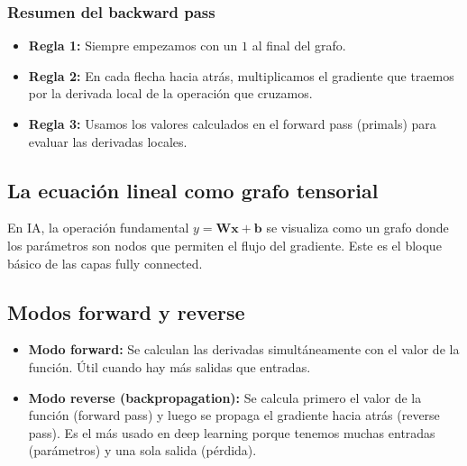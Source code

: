 \documentclass[12pt,a4paper,openany,oneside]{book}
\begin{document}
\subsubsection{Resumen del backward pass}
\begin{itemize}
    \item \textbf{Regla 1:} Siempre empezamos con un $1$ al final del grafo.
    \item \textbf{Regla 2:} En cada flecha hacia atrás, multiplicamos el gradiente que traemos por la derivada local de la operación que cruzamos.
    \item \textbf{Regla 3:} Usamos los valores calculados en el forward pass (primals) para evaluar las derivadas locales.
\end{itemize}

\subsection{La ecuación lineal como grafo tensorial}
En IA, la operación fundamental $y = \mathbf{W}\mathbf{x} + \mathbf{b}$ se visualiza como un grafo donde los parámetros son nodos que permiten el flujo del gradiente. Este es el bloque básico de las capas fully connected.

\begin{center}
\end{center}

\subsection{Modos forward y reverse}
\begin{itemize}
    \item \textbf{Modo forward:} Se calculan las derivadas simultáneamente con el valor de la función. Útil cuando hay más salidas que entradas.
    \item \textbf{Modo reverse (backpropagation):} Se calcula primero el valor de la función (forward pass) y luego se propaga el gradiente hacia atrás (reverse pass). Es el más usado en deep learning porque tenemos muchas entradas (parámetros) y una sola salida (pérdida).
\end{itemize}
\end{document}
